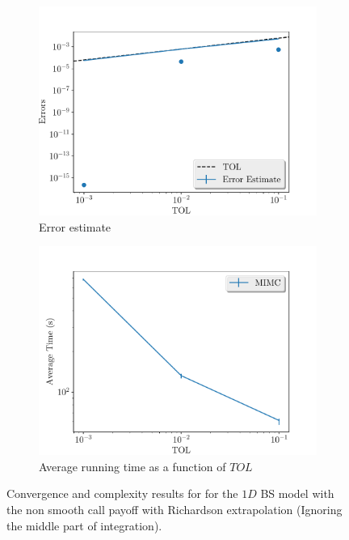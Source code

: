\documentclass[11pt]{article}
\begin{document}
\begin{figure}[!h]
	\centering
	\begin{subfigure}{.5\textwidth}
		\centering
		\includegraphics[width=1\linewidth]{./figures/1D_BS_4_8_step_non_smooth_richardson_without_middle/error_estimate.pdf}
		\caption{Error estimate}
		\label{fig:misc_1D_BS_4_8_step_non_smooth_richardson_without_middle_sub1}
	\end{subfigure}%
	\begin{subfigure}{.5\textwidth}
		\centering
		\includegraphics[width=1\linewidth]{./figures/1D_BS_4_8_step_non_smooth_richardson_without_middle/average_running_time.pdf}
		\caption{Average running time as a function of $TOL$}
		\label{fig:misc_1D_BS_4_8_step_non_smooth_richardson_without_middle_sub2}
	\end{subfigure}%
	\caption{Convergence and complexity results for for the $1D$ BS model with the non smooth call payoff with Richardson extrapolation (Ignoring the middle part of integration).}
	\label{fig:misc_1D_BS_4_8_step_non_smooth_richardson_without_middle_1}
\end{figure}
\end{document}
